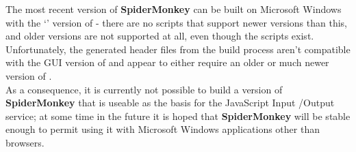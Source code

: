 \tertiaryEnd{}
The most recent version of \textbf{SpiderMonkey} can be built on Microsoft Windows with
the `' version of  - there are
no scripts that support newer versions than this, and older versions are not supported at
all, even though the scripts exist.\\

Unfortunately, the generated header files from the build process aren't compatible with
the GUI version of  and appear to either require an older or much
newer version of .\\

As a consequence, it is currently not possible to build a version of \textbf{SpiderMonkey}
that is useable as the basis for the JavaScript Input /Output service; at some time in
the future it is hoped that \textbf{SpiderMonkey} will be stable enough to permit using it
with Microsoft Windows applications other than browsers.
